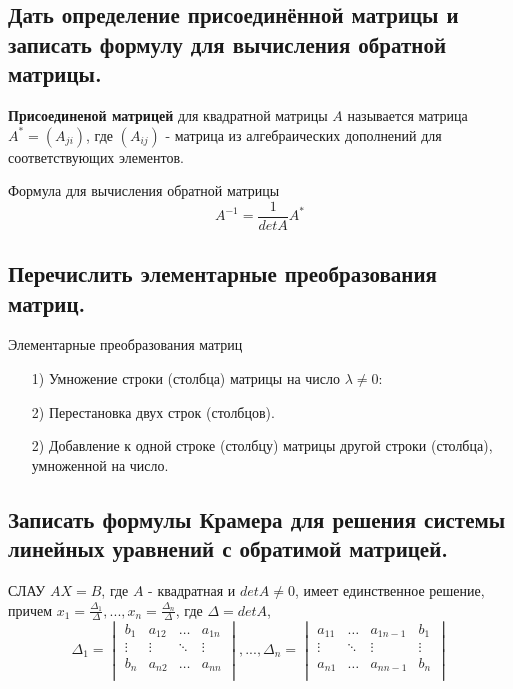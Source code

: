 \subsection{Дать определение присоединённой матрицы и записать формулу для вычисления обратной матрицы.}

{\bf{Присоединеной матрицей}} для квадратной матрицы $A$ называется матрица $A^* = (A_{ji})$, где $(A_{ij})$ - матрица из алгебраических дополнений для соответствующих элементов.

Формула для вычисления обратной матрицы
$$A^{-1} = \frac{1}{detA}A^*$$

\vspace*{15pt}
\vspace*{15pt}

\subsection{Перечислить элементарные преобразования матриц.}

Элементарные преобразования матриц
\begin{enumerate}
    \item[1)] Умножение строки (столбца) матрицы на число $\lambda \ne 0$:
    \item[2)] Перестановка двух строк (столбцов).
    \item[2)] Добавление к одной строке (столбцу) матрицы другой строки (столбца), умноженной на число.
\end{enumerate}

\subsection{Записать формулы Крамера для решения системы линейных уравнений с обратимой матрицей.}

СЛАУ $AX = B$, где $A$ - квадратная и $detA \ne 0$, имеет единственное решение, причем $x_1 = \frac{\Delta_1}{\Delta}, ..., x_n = \frac{\Delta_n}{\Delta}$, где $\Delta = detA$,
$$\Delta_1 = 
\begin{vmatrix}
    b_1&a_{12}&\ldots&a_{1n}\\
    \vdots&\vdots&\ddots&\vdots\\
    b_n&a_{n2}&\ldots&a_{nn}\\
\end{vmatrix}, ..., 
\Delta_n = 
\begin{vmatrix}
    a_{11}&\ldots&a_{1n-1}&b_1\\
    \vdots&\ddots&\vdots&\vdots\\
    a_{n1}&\ldots&a_{nn-1}&b_n\\
\end{vmatrix}
$$

